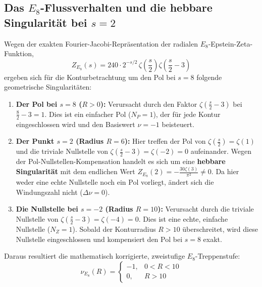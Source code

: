 \documentclass[11pt,a4paper]{article}
\begin{document}
	\subsection{Das $E_8$-Flussverhalten und die hebbare Singularität bei $s=2$}
	Wegen der exakten Fourier-Jacobi-Repräsentation der radialen $E_8$-Epstein-Zeta-Funktion,
	\begin{equation}
		Z_{E_8}(s) = 240 \cdot 2^{-s/2} \, \zeta\left(\frac{s}{2}\right) \zeta\left(\frac{s}{2}-3\right)
	\end{equation}
	ergeben sich für die Konturbetrachtung um den Pol bei $s=8$ folgende geometrische Singularitäten:
	\begin{enumerate}
		\item \textbf{Der Pol bei $s = 8$ ($R > 0$):} Verursacht durch den Faktor $\zeta\left(\frac{s}{2}-3\right)$ bei $\frac{8}{2}-3 = 1$. Dies ist ein einfacher Pol ($N_P = 1$), der für jede Kontur eingeschlossen wird und den Basiswert $\nu = -1$ beisteuert.
		\item \textbf{Der Punkt $s = 2$ (Radius $R = 6$):} Hier treffen der Pol von $\zeta\left(\frac{s}{2}\right) = \zeta(1)$ und die triviale Nullstelle von $\zeta\left(\frac{s}{2}-3\right) = \zeta(-2) = 0$ aufeinander. Wegen der Pol-Nullstellen-Kompensation handelt es sich um eine \textbf{hebbare Singularität} mit dem endlichen Wert $Z_{E_8}(2) = -\frac{30\zeta(3)}{\pi^2} \neq 0$. Da hier weder eine echte Nullstelle noch ein Pol vorliegt, ändert sich die Windungszahl nicht ($\Delta \nu = 0$).
		\item \textbf{Die Nullstelle bei $s = -2$ (Radius $R = 10$):} Verursacht durch die triviale Nullstelle von $\zeta\left(\frac{s}{2}-3\right) = \zeta(-4) = 0$. Dies ist eine echte, einfache Nullstelle ($N_Z = 1$). Sobald der Konturradius $R > 10$ überschreitet, wird diese Nullstelle eingeschlossen und kompensiert den Pol bei $s=8$ exakt.
	\end{enumerate}
	Daraus resultiert die mathematisch korrigierte, zweistufige $E_8$-Treppenstufe:
	\begin{equation}
		\nu_{E_8}(R) = \begin{cases} -1, & 0 < R < 10 \\ 0, & R > 10 \end{cases}
	\end{equation}
	
\end{document}
